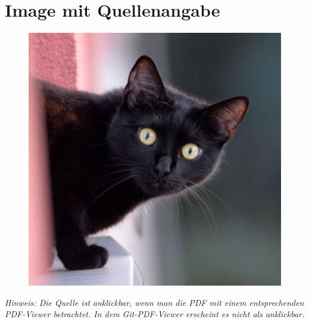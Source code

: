 \documentclass{scrarticle}
\begin{document}
	\section{Image mit Quellenangabe}
	\begin{figure}[h!hbt]
		\centering
		\includegraphics[width=\linewidth]{./Abbildungen/Beispiel.jpg}
	\end{figure}
	\noindent \textit{Hinweis: Die Quelle ist anklickbar, wenn man die PDF mit einem entsprechenden PDF-Viewer betrachtet. In dem Git-PDF-Viewer erscheint es nicht als anklickbar.}
\end{document}
